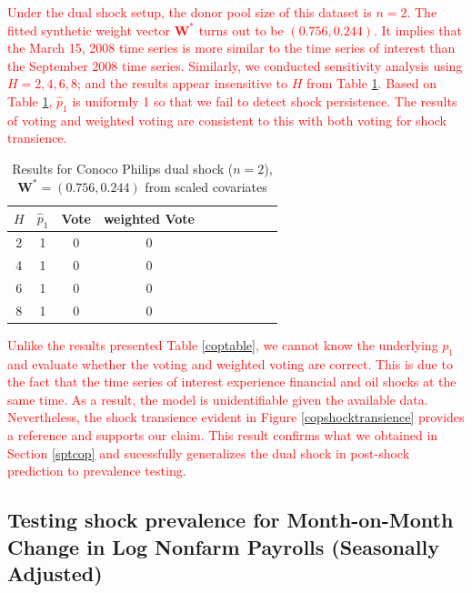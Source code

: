 \documentclass[11pt]{article}
\def\mbf#1{\mathbf{#1}} %
\theoremstyle{definition}
\begin{document}
\textcolor{red}{Under the dual shock setup, the donor pool size of this dataset is $n=2$. The fitted synthetic weight vector $\mbf{W}^*$ turns out to be $(0.756, 0.244)$. It implies that the March 15, 2008 time series is more similar to the time series of interest than the September 2008 time series. Similarly, we conducted sensitivity analysis using   $H = 2, 4, 6, 8$; and the results appear insensitive to $H$ from Table \ref{dualshock}. Based on Table \ref{dualshock}, $\hat{p}_1$ is uniformly 1 so that we fail to detect shock persistence. The results of voting and weighted voting are consistent to this with both voting for shock transience.}

\begin{table}[H]
	\caption{Results for Conoco Philips dual shock ($n=2$), $\mbf{W}^* = (0.756, 0.244)$ from scaled covariates} \label{dualshock}
\begin{center}
  \begin{tabular}{cccccccccr}
     $H$   &  $\hat{p}_1$ &   Vote   & weighted Vote  \\
     \hline 
     2  & 1    & 0  &0   \\ 
     4  & 1 & 0   &0   \\ 
     6   & 1  &0  & 0  \\ 
     8   & 1  & 0   & 0  
  \end{tabular}
\end{center}	
\end{table}

\textcolor{red}{ Unlike the results presented Table \ref{coptable}, we cannot know  the underlying $p_1$ and evaluate whether the voting and weighted voting are correct. This is due to the fact that the time series of interest experience financial and oil shocks at the same time. As a result,   the model is unidentifiable given the available  data. Nevertheless, the shock transience evident in Figure \ref{copshocktransience} provides a reference and supports our claim. This result confirms what we obtained in Section \ref{sptcop} and sucessfully generalizes the dual shock in post-shock prediction \citep{lin2021minimizing} to prevalence testing.}



\subsection{Testing shock prevalence for Month-on-Month Change in Log Nonfarm Payrolls (Seasonally Adjusted)}

\label{sptuem}
\end{document}
